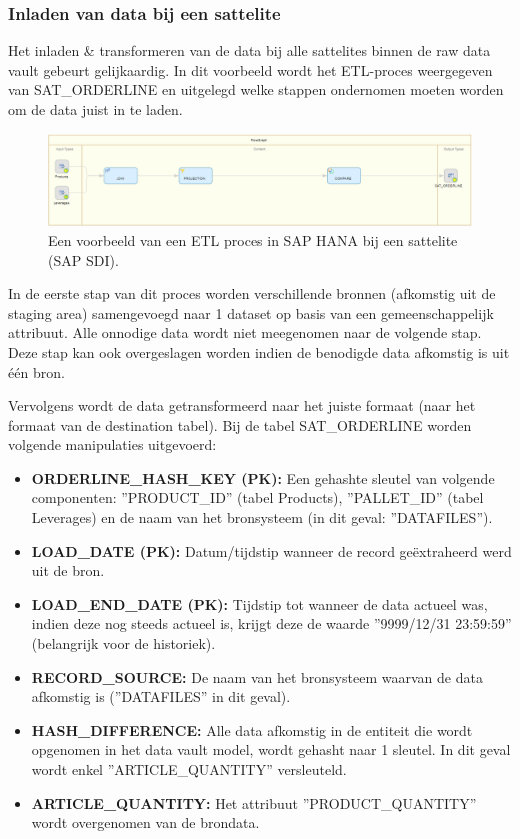 \subsubsection{Inladen van data bij een sattelite}
Het inladen \& transformeren van de data bij alle sattelites binnen de raw data vault gebeurt gelijkaardig. In dit voorbeeld wordt het ETL-proces weergegeven van SAT\_ORDERLINE en uitgelegd welke stappen ondernomen moeten worden om de data juist in te laden.
\begin{figure}[h]
	\centering
	\includegraphics[scale=0.45]{../images/DV_FG_sattelite.png}
	\caption{Een voorbeeld van een ETL proces in SAP HANA bij een sattelite (SAP SDI).}
	\label{fig:etlsat}
\end{figure}
		
In de eerste stap van dit proces worden verschillende bronnen (afkomstig uit de staging area) samengevoegd naar 1 dataset op basis van een gemeenschappelijk attribuut. Alle onnodige data wordt niet meegenomen naar de volgende stap. Deze stap kan ook overgeslagen worden indien de benodigde data afkomstig is uit één bron.

Vervolgens wordt de data getransformeerd naar het juiste formaat (naar het formaat van de destination tabel). Bij de tabel SAT\_ORDERLINE worden volgende manipulaties uitgevoerd:

\begin{itemize}
	\item \textbf{ORDERLINE\_HASH\_KEY (PK):} Een gehashte sleutel van volgende componenten: ''PRODUCT\_ID'' (tabel Products), ''PALLET\_ID'' (tabel Leverages) en de naam van het bronsysteem (in dit geval: ''DATAFILES'').
	\item \textbf{LOAD\_DATE (PK):} Datum/tijdstip wanneer de record geëxtraheerd werd uit de bron.
	\item \textbf{LOAD\_END\_DATE (PK):} Tijdstip tot wanneer de data actueel was, indien deze nog steeds actueel is, krijgt deze de waarde ''9999/12/31 23:59:59'' (belangrijk voor de historiek).
	\item \textbf{RECORD\_SOURCE:} De naam van het bronsysteem waarvan de data afkomstig is (''DATAFILES'' in dit geval).
	\item \textbf{HASH\_DIFFERENCE:} Alle data afkomstig in de entiteit die wordt opgenomen in het data vault model, wordt gehasht naar 1 sleutel. In dit geval wordt enkel ''ARTICLE\_QUANTITY'' versleuteld. 
	\item \textbf{ARTICLE\_QUANTITY:} Het attribuut ''PRODUCT\_QUANTITY'' wordt overgenomen van de brondata.
\end{itemize} 

